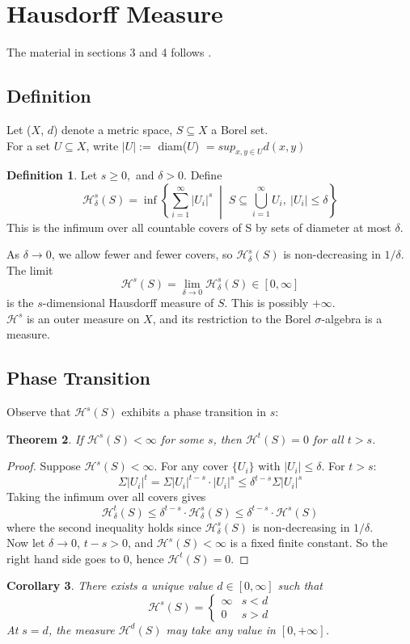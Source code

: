 \documentclass[11pt, a4paper]{article}
\theoremstyle{plain}
\newtheorem{theorem}{Theorem}[section]
\newtheorem{corollary}[theorem]{Corollary}
\theoremstyle{definition}
\newtheorem{definition}[theorem]{Definition}
\theoremstyle{remark}
\newcommand{\Hm}[1]{\mathcal{H}^{#1}}   %
\begin{document}
\section{Hausdorff Measure}
The material in sections 3 and 4 follows \cite{falconer2003}.
\subsection{Definition} Let ($X$, $d$) denote  a metric space, $S \subseteq X$ a Borel set. \\For a set $U \subseteq X$, write $|U| := $ diam($U$) $= sup_{x,y\in U}d(x, y)$
\begin{definition}
    Let $s \geq 0,$ and $\delta > 0$. Define \[
    \Hm{s}_\delta(S) = \inf\left\{
      \sum_{i=1}^{\infty} |U_i|^s 
      \;\middle|\; 
      S \subseteq \bigcup_{i=1}^{\infty} U_i,\ |U_i| \leq \delta
    \right\}
    \]
    This is the infimum over all countable covers of S by sets of diameter at most $\delta$.
\end{definition}
\noindent As $\delta \rightarrow 0$, we allow fewer and fewer covers, so $\Hm{s}_\delta(S)$ is non-decreasing in $1/\delta$. The limit \[
\Hm{s}(S) = \lim\limits_{\delta\rightarrow 0}\Hm{s}_{\delta}(S)\in [0, \infty]
\]
is the $s$-dimensional Hausdorff measure of $S$. This is possibly $+\infty$.\\
$\Hm{s}$ is an outer measure on $X$, and its restriction to the Borel $\sigma$-algebra is a measure. 

\subsection{Phase Transition}
Observe that $\Hm{s}(S)$ exhibits a phase transition in $s$:
\begin{theorem}
    If $\Hm{s}(S) < \infty$ for some $s$, then $\Hm{t}(S) = 0$ for all $t > s$.
\end{theorem}
\begin{proof}
    Suppose $\Hm{s}(S) < \infty$. For any cover $\{U_i\}$ with $|U_i| \leq \delta$. For $t>s$:\[
    \Sigma|U_i|^t=\Sigma|U_i|^{t-s}\cdot|U_i|^s\leq\delta^{t-s}\Sigma|U_i|^s
    \]
    Taking the infimum over all covers gives \[\Hm{t}_\delta(S) \leq \delta^{t-s}\cdot\Hm{s}_\delta(S)\leq\delta^{t-s}\cdot\Hm{s}(S)\] where the second inequality holds since $\Hm{s}_\delta(S)$ is non-decreasing in $1/\delta$.\\
    Now let $\delta\rightarrow0$, $t-s>0$, and $\Hm{s}(S) < \infty$ is a fixed finite constant. So the right hand side goes to 0, hence $\Hm{t}(S)=0$.
\end{proof}
\begin{corollary}
There exists a unique value $d\in[0, \infty]$ such that\[
\Hm{s}(S) = \begin{cases} 
\text{$\infty$}&\text{$s < d$}\\
\text{$0$}&\text{$s > d$}
\end{cases}
\]
At $s=d$, the measure $\Hm{d}(S)$ may take any value in $[0, +\infty]$.
\end{corollary}
\newpage
\end{document}

